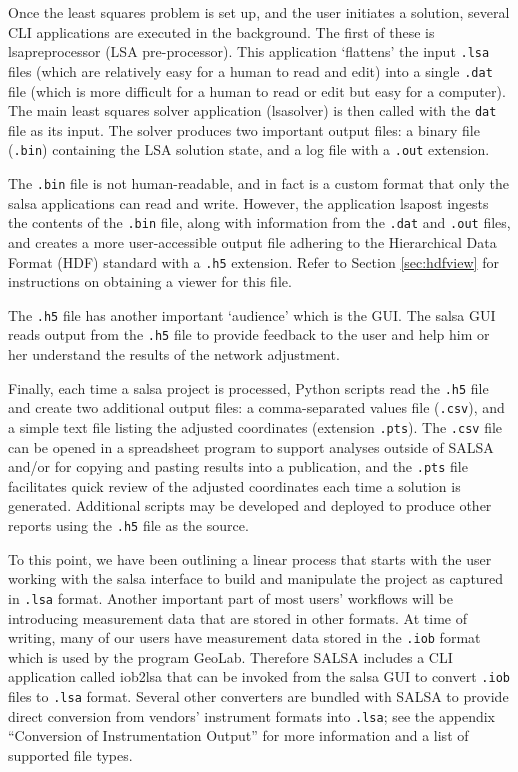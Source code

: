 Once the least squares problem is set up, and the user initiates a solution, several CLI applications are executed in the background.  The first of these is \textsf{lsapreprocessor} (LSA pre-processor).  This application `flattens' the input \verb+.lsa+ files (which are relatively easy for a human to read and edit) into a single \verb+.dat+ file (which is more difficult for a human to read or edit but easy for a computer).  The main least squares solver application (\textsf{lsasolver}) is then called with the \verb+dat+ file as its input.  The solver produces two important output files: a binary file (\verb+.bin+) containing the LSA solution state, and a log file with a \verb+.out+ extension.

The \verb+.bin+ file is not human-readable, and in fact is a custom format that only the \textsf{salsa} applications can read and write.  However, the application \textsf{lsapost} ingests the contents of the \verb+.bin+ file, along with information from the \verb+.dat+ and \verb+.out+ files, and creates a more user-accessible output file adhering to the Hierarchical Data Format (HDF) standard with a \verb+.h5+ extension.  Refer to Section \ref{sec:hdfview} for instructions on obtaining a viewer for this file.

The \verb+.h5+ file has another important `audience' which is the GUI.  The \textsf{salsa} GUI reads output from the \verb+.h5+ file to provide feedback to the user and help him or her understand the results of the network adjustment.

Finally, each time a \textsf{salsa} project is processed, Python scripts read the \verb+.h5+ file and create two additional output files: a comma-separated values file (\verb+.csv+), and a simple text file listing the adjusted coordinates (extension \verb+.pts+).  The \verb+.csv+ file can be opened in a spreadsheet program to support analyses outside of SALSA and/or for copying and pasting results into a publication, and the \verb+.pts+ file facilitates quick review of the adjusted coordinates each time a solution is generated.  Additional scripts may be developed and deployed to produce other reports using the \verb+.h5+ file as the source.

To this point, we have been outlining a linear process that starts with the user working with the \textsf{salsa} interface to build and manipulate the project as captured in \verb+.lsa+ format.  Another important part of most users' workflows will be introducing measurement data that are stored in other formats.  At time of writing, many of our users have measurement data stored in the \verb+.iob+ format which is used by the program GeoLab.  Therefore SALSA includes a CLI application called \textsf{iob2lsa} that can be invoked from the \textsf{salsa} GUI to convert \verb+.iob+ files to \verb+.lsa+ format.  Several other converters are bundled with SALSA to provide direct conversion from vendors' instrument formats into \verb+.lsa+; see the appendix ``Conversion of Instrumentation Output'' for more information and a list of supported file types.

